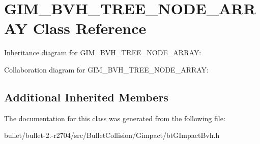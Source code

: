\hypertarget{class_g_i_m___b_v_h___t_r_e_e___n_o_d_e___a_r_r_a_y}{\section{G\+I\+M\+\_\+\+B\+V\+H\+\_\+\+T\+R\+E\+E\+\_\+\+N\+O\+D\+E\+\_\+\+A\+R\+R\+A\+Y Class Reference}
\label{class_g_i_m___b_v_h___t_r_e_e___n_o_d_e___a_r_r_a_y}
}


Inheritance diagram for G\+I\+M\+\_\+\+B\+V\+H\+\_\+\+T\+R\+E\+E\+\_\+\+N\+O\+D\+E\+\_\+\+A\+R\+R\+A\+Y\+:


Collaboration diagram for G\+I\+M\+\_\+\+B\+V\+H\+\_\+\+T\+R\+E\+E\+\_\+\+N\+O\+D\+E\+\_\+\+A\+R\+R\+A\+Y\+:
\subsection*{Additional Inherited Members}


The documentation for this class was generated from the following file\+:\begin{DoxyCompactItemize}
\item 
bullet/bullet-\/2.-\/r2704/src/\+Bullet\+Collision/\+Gimpact/bt\+G\+Impact\+Bvh.\+h\end{DoxyCompactItemize}
